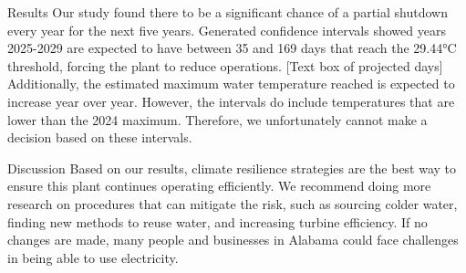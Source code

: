 \documentclass[
  letterpaper,
  DIV=11,
  numbers=noendperiod]{scrreprt}
\begin{document}
Results Our study found there to be a significant chance of a partial
shutdown every year for the next five years. Generated confidence
intervals showed years 2025-2029 are expected to have between 35 and 169
days that reach the 29.44°C threshold, forcing the plant to reduce
operations. {[}Text box of projected days{]} Additionally, the estimated
maximum water temperature reached is expected to increase year over
year. However, the intervals do include temperatures that are lower than
the 2024 maximum. Therefore, we unfortunately cannot make a decision
based on these intervals.

Discussion Based on our results, climate resilience strategies are the
best way to ensure this plant continues operating efficiently. We
recommend doing more research on procedures that can mitigate the risk,
such as sourcing colder water, finding new methods to reuse water, and
increasing turbine efficiency. If no changes are made, many people and
businesses in Alabama could face challenges in being able to use
electricity.
\end{document}

